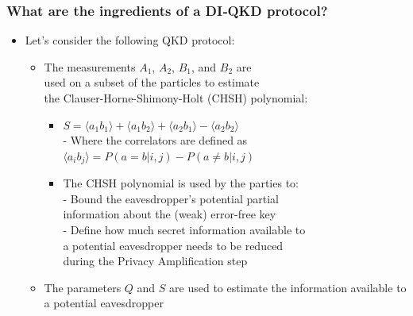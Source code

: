 \documentclass{beamer}
\begin{document}
		\begin{frame}
			\frametitle{\large What are the ingredients of a DI‑QKD protocol?}

            \vspace{3ex}
            \begin{itemize}
                \item Let's consider the following QKD protocol:
                \begin{itemize}
                    \item The measurements ${A}_{1}$, ${A}_{2}$, ${B}_{1}$, and ${B}_{2}$ are\\ used on a subset of the particles to estimate\\ the Clauser-Horne-Shimony-Holt (CHSH) polynomial:
                    \begin{itemize}
                        \item $S = \langle {a}_{1} {b}_{1} \rangle + \langle {a}_{1} {b}_{2} \rangle + \langle {a}_{2} {b}_{1} \rangle - \langle {a}_{2} {b}_{2} \rangle$\\
                        \vspace{1ex}
                        - Where the correlators are defined as\\
                        \hspace{0.5em}$\langle {a}_{i} {b}_{j} \rangle = P(a = b | i,j) - P(a \neq b|i,j)$
                        \vspace{0.5em}
                        \item The CHSH polynomial is used by the parties to:\\
                        - Bound the eavesdropper's potential partial\\\hspace{0.5em}information about the (weak) error-free key\\
                        - Define how much secret information available to\\\hspace{0.5em}a potential eavesdropper needs to be reduced\\\hspace{0.5em}during the Privacy Amplification step
                    \end{itemize}
                    \item The parameters $Q$ and $S$ are used to estimate the information available to a potential eavesdropper
                \end{itemize}
            \end{itemize}
		\end{frame}
\end{document}
